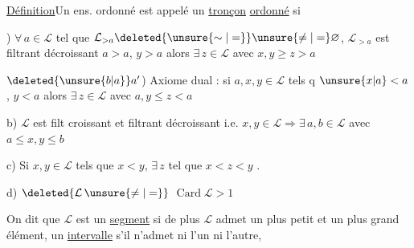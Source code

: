 


\uline{Définition}\quad Un ens. ordonné  est appelé un \uline{tronçon} \uline{ordonné} si

) $\forall\,a\in\mathcal L$ tel que $\mathcal L_{>a}\deleted{\unsure{\sim|=}}\unsure{\ne|=}\varnothing$, $\mathcal L_{>a}$ est filtrant décroissant
 
$a>a$, $y>a$ alors $\exists\,z\in\mathcal L$ avec $x,y\geq z>a$

$\deleted{\unsure{b|a}}a'$) Axiome dual : si $a,x,y\in\mathcal L$ tels q
$\unsure{x|a}<a$, $y<a$ alors $\exists\,z\in\mathcal L$ avec $a,y\leq z<a$

b) $\mathcal L$ est filt croissant et filtrant décroissant i.e.
$x,y\in\mathcal L\Rightarrow\exists\,a,b\in\mathcal L$ avec $a\leq x,y\leq b$

c) Si $x,y\in\mathcal L$ tels que $x<y$, $\exists\,z$ tel que $x<z<y$ .

d) $\deleted{\mathcal L\,\unsure{\ne|=}}$ $\operatorname{Card}\mathcal L>1$ 


On dit que $\mathcal L$ est un \uline{segment} si de plus $\mathcal L$ admet un plus petit et
 un plus grand élément, un \uline{intervalle} s'il n'admet ni l'un ni l'autre,

